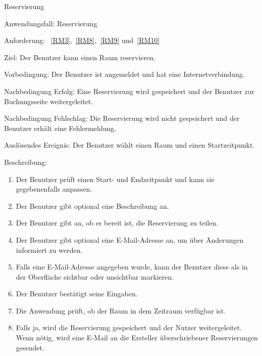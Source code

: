 \begin{function}{20}{Reservierung}
    \item[Anwendungsfall:] Reservierung
    \item[Anforderung:]~\ref{RM3},~\ref{RM8},~\ref{RM9} und~\ref{RM10}
    \item[Ziel:] Der Benutzer kann einen Raum reservieren.
    \item[Vorbedingung:] Der Benutzer ist angemeldet und hat eine Internetverbindung.
    \item[Nachbedingung Erfolg:] Eine Reservierung wird gespeichert und der Benutzer zur Buchungsseite weitergeleitet.
    \item[Nachbedingung Fehlschlag:] Die Reservierung wird nicht gespeichert und der Benutzer erhält eine Fehlermeldung.
    \item[Auslösendes Ereignis:] Der Benutzer wählt einen Raum und einen Startzeitpunkt.
    \item[Beschreibung:] ~
    \begin{enumerate}
        \item Der Benutzer prüft einen Start- und Endzeitpunkt und kann sie gegebenenfalls anpassen.
        \item Der Benutzer gibt optional eine Beschreibung an.
        \item Der Benutzer gibt an, ob er bereit ist, die Reservierung zu teilen.
        \item Der Benutzer gibt optional eine E-Mail-Adresse an, um über Änderungen informiert zu werden.
        \item Falls eine E-Mail-Adresse angegeben wurde, kann der Benutzer diese als in der Oberfläche sichtbar oder unsichtbar markieren.
        \item Der Benutzer bestätigt seine Eingaben.
        \item Die Anwendung prüft, ob der Raum in dem Zeitraum verfügbar ist.
        \item Falls ja, wird die Reservierung gespeichert und der Nutzer weitergeleitet.
              Wenn nötig, wird eine E-Mail an die Ersteller überschriebener Reservierungen gesendet.
    \end{enumerate}
\end{function}
